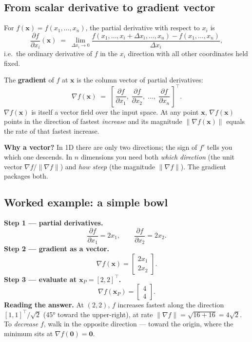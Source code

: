 \documentclass[11pt, a4paper]{article}
\begin{document}
\subsection{From scalar derivative to gradient vector}

\begin{defbox}
For $f(\mathbf{x}) = f(x_1, \ldots, x_n)$, the partial derivative with respect to $x_i$ is
\[
\frac{\partial f}{\partial x_i}(\mathbf{x}) \;=\; \lim_{\Delta x_i \to 0}\frac{f(x_1, \ldots, x_i + \Delta x_i, \ldots, x_n) - f(x_1, \ldots, x_n)}{\Delta x_i},
\]
i.e.\ the ordinary derivative of $f$ in the $x_i$ direction with all other coordinates held fixed.
\end{defbox}

\begin{defbox}[Gradient]
The \textbf{gradient} of $f$ at $\mathbf{x}$ is the column vector of partial derivatives:
\[
\nabla f(\mathbf{x}) \;=\; \left[\,\frac{\partial f}{\partial x_1},\;\frac{\partial f}{\partial x_2},\;\ldots,\;\frac{\partial f}{\partial x_n}\,\right]^{\!\top}.
\]
$\nabla f(\mathbf{x})$ is itself a vector field over the input space. At any point $\mathbf{x}$, $\nabla f(\mathbf{x})$ points in the direction of fastest \emph{increase} and its magnitude $\|\nabla f(\mathbf{x})\|$ equals the rate of that fastest increase.
\end{defbox}

\textbf{Why a vector?} In 1D there are only two directions; the sign of $f'$ tells you which one descends. In $n$ dimensions you need both \emph{which direction} (the unit vector $\nabla f / \|\nabla f\|$) and \emph{how steep} (the magnitude $\|\nabla f\|$). The gradient packages both.

\subsection{Worked example: a simple bowl}

\begin{exbox}[{$f(x_1, x_2) = x_1^2 + x_2^2$ at $\mathbf{x}_P = [2,2]^\top$}]
\textbf{Step 1 — partial derivatives.}
\[
\frac{\partial f}{\partial x_1} = 2x_1, \qquad \frac{\partial f}{\partial x_2} = 2x_2.
\]
\textbf{Step 2 — gradient as a vector.}
\[
\nabla f(\mathbf{x}) = \begin{bmatrix} 2x_1 \\ 2x_2 \end{bmatrix}.
\]
\textbf{Step 3 — evaluate at $\mathbf{x}_P = [2,2]^\top$.}
\[
\nabla f(\mathbf{x}_P) = \begin{bmatrix} 4 \\ 4 \end{bmatrix}.
\]
\textbf{Reading the answer.} At $(2,2)$, $f$ increases fastest along the direction $[1,1]^\top/\sqrt{2}$ (45° toward the upper-right), at rate $\|\nabla f\| = \sqrt{16+16} = 4\sqrt 2$. To \emph{decrease} $f$, walk in the opposite direction — toward the origin, where the minimum sits at $\nabla f(\mathbf{0}) = \mathbf{0}$.
\end{exbox}
\end{document}
